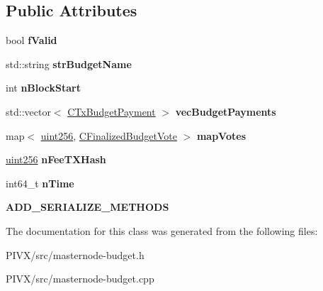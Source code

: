 \subsection*{Public Attributes}
\begin{DoxyCompactItemize}
\item 
\mbox{\label{class_c_finalized_budget_a00d9e3055bebaaef28543bd67e4ca162}} 
bool {\bfseries f\+Valid}
\item 
\mbox{\label{class_c_finalized_budget_ae2a467abad2985ff3c32b29fc75500aa}} 
std\+::string {\bfseries str\+Budget\+Name}
\item 
\mbox{\label{class_c_finalized_budget_a1d04c262e10f4588b17eb3aba5ed9b52}} 
int {\bfseries n\+Block\+Start}
\item 
\mbox{\label{class_c_finalized_budget_a639e7be9254d99deb42aeeb15de63174}} 
std\+::vector$<$ \mbox{\hyperlink{class_c_tx_budget_payment}{C\+Tx\+Budget\+Payment}} $>$ {\bfseries vec\+Budget\+Payments}
\item 
\mbox{\label{class_c_finalized_budget_a756460095ed59fd39e7f3018b4b208dd}} 
map$<$ \mbox{\hyperlink{classuint256}{uint256}}, \mbox{\hyperlink{class_c_finalized_budget_vote}{C\+Finalized\+Budget\+Vote}} $>$ {\bfseries map\+Votes}
\item 
\mbox{\label{class_c_finalized_budget_a699a2f3cbea723957c2a944b08484bb5}} 
\mbox{\hyperlink{classuint256}{uint256}} {\bfseries n\+Fee\+T\+X\+Hash}
\item 
\mbox{\label{class_c_finalized_budget_a3bb3cb1d44021d5ef9996a81f3e09734}} 
int64\+\_\+t {\bfseries n\+Time}
\item 
\mbox{\label{class_c_finalized_budget_ad426a5e67867bcb8f73df4aef50ac588}} 
{\bfseries A\+D\+D\+\_\+\+S\+E\+R\+I\+A\+L\+I\+Z\+E\+\_\+\+M\+E\+T\+H\+O\+DS}
\end{DoxyCompactItemize}


The documentation for this class was generated from the following files\+:\begin{DoxyCompactItemize}
\item 
P\+I\+V\+X/src/masternode-\/budget.\+h\item 
P\+I\+V\+X/src/masternode-\/budget.\+cpp\end{DoxyCompactItemize}
